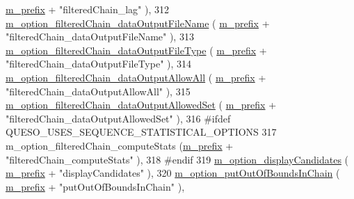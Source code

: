 \begin{DoxyCode}
      \hyperlink{class_q_u_e_s_o_1_1_metropolis_hastings_s_g_options_a4f7c510aaa530336d24259e2a89f5d0b}{m\_prefix} + \textcolor{stringliteral}{"filteredChain\_lag"}                         ),
312   \hyperlink{class_q_u_e_s_o_1_1_metropolis_hastings_s_g_options_a340a0e9c2b5c2bec86d143cb0f8d64f6}{m\_option\_filteredChain\_dataOutputFileName}          (
      \hyperlink{class_q_u_e_s_o_1_1_metropolis_hastings_s_g_options_a4f7c510aaa530336d24259e2a89f5d0b}{m\_prefix} + \textcolor{stringliteral}{"filteredChain\_dataOutputFileName"}          ),
313   \hyperlink{class_q_u_e_s_o_1_1_metropolis_hastings_s_g_options_aca1e9af38b6ef1b83bf1fda6477404c4}{m\_option\_filteredChain\_dataOutputFileType}          (
      \hyperlink{class_q_u_e_s_o_1_1_metropolis_hastings_s_g_options_a4f7c510aaa530336d24259e2a89f5d0b}{m\_prefix} + \textcolor{stringliteral}{"filteredChain\_dataOutputFileType"}          ),
314   \hyperlink{class_q_u_e_s_o_1_1_metropolis_hastings_s_g_options_a7317db52b0866c8895ad1a16d4a4b337}{m\_option\_filteredChain\_dataOutputAllowAll}          (
      \hyperlink{class_q_u_e_s_o_1_1_metropolis_hastings_s_g_options_a4f7c510aaa530336d24259e2a89f5d0b}{m\_prefix} + \textcolor{stringliteral}{"filteredChain\_dataOutputAllowAll"}          ),
315   \hyperlink{class_q_u_e_s_o_1_1_metropolis_hastings_s_g_options_a361df3110aea27f35465dedac372a90f}{m\_option\_filteredChain\_dataOutputAllowedSet}        (
      \hyperlink{class_q_u_e_s_o_1_1_metropolis_hastings_s_g_options_a4f7c510aaa530336d24259e2a89f5d0b}{m\_prefix} + \textcolor{stringliteral}{"filteredChain\_dataOutputAllowedSet"}        ),
316 \textcolor{preprocessor}{#ifdef QUESO\_USES\_SEQUENCE\_STATISTICAL\_OPTIONS}
317 \textcolor{preprocessor}{}  m\_option\_filteredChain\_computeStats                (\hyperlink{class_q_u_e_s_o_1_1_metropolis_hastings_s_g_options_a4f7c510aaa530336d24259e2a89f5d0b}{m\_prefix} + \textcolor{stringliteral}{"filteredChain\_computeStats"}      
                ),
318 \textcolor{preprocessor}{#endif}
319 \textcolor{preprocessor}{}  \hyperlink{class_q_u_e_s_o_1_1_metropolis_hastings_s_g_options_a7881fafcf3caa7bf33d20ff0a7576944}{m\_option\_displayCandidates}                         (
      \hyperlink{class_q_u_e_s_o_1_1_metropolis_hastings_s_g_options_a4f7c510aaa530336d24259e2a89f5d0b}{m\_prefix} + \textcolor{stringliteral}{"displayCandidates"}                         ),
320   \hyperlink{class_q_u_e_s_o_1_1_metropolis_hastings_s_g_options_a6d1856b0435c6dfcac6b75ec36829b47}{m\_option\_putOutOfBoundsInChain}                     (
      \hyperlink{class_q_u_e_s_o_1_1_metropolis_hastings_s_g_options_a4f7c510aaa530336d24259e2a89f5d0b}{m\_prefix} + \textcolor{stringliteral}{"putOutOfBoundsInChain"}                     ),

\end{DoxyCode}
